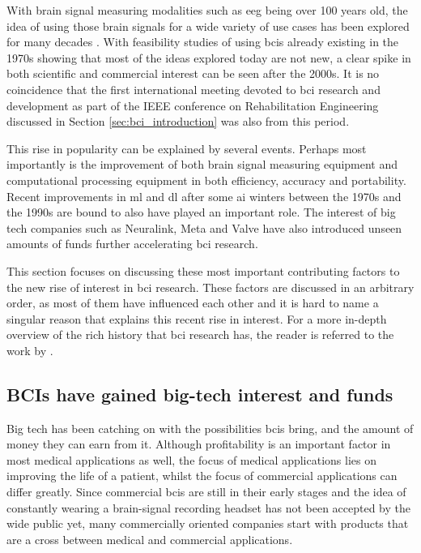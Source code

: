 With brain signal measuring modalities such as \gls{eeg} being over 100 years old, the idea of using those brain signals for a wide variety of use cases has been explored for many decades \citep{human_eeg_discovery, first_eeg, bci_history}.
With feasibility studies of using \glspl{bci} already existing in the 1970s \citep[for example by][]{early_bci} showing that most of the ideas explored today are not new, a clear spike in both scientific and commercial interest can be seen after the 2000s.
It is no coincidence that the first international meeting devoted to \gls{bci} research and development as part of the IEEE conference on Rehabilitation Engineering discussed in Section \ref{sec:bci_introduction} was also from this period.

This rise in popularity can be explained by several events.
Perhaps most importantly is the improvement of both brain signal measuring equipment and computational processing equipment in both efficiency, accuracy and portability.
Recent improvements in \gls{ml} and \gls{dl} after some \gls{ai} winters between the 1970s and the 1990s are bound to also have played an important role.
The interest of big tech companies such as Neuralink, Meta and Valve have also introduced unseen amounts of funds further accelerating \gls{bci} research.

This section focuses on discussing these most important contributing factors to the new rise of interest in \gls{bci} research.
These factors are discussed in an arbitrary order, as most of them have influenced each other and it is hard to name a singular reason that explains this recent rise in interest.
For a more in-depth overview of the rich history that \gls{bci} research has, the reader is referred to the work by \citet{bci_history}.


\subsection{BCIs have gained big-tech interest and funds}
\label{subsec:bci_gaining_popularity_big_tech}

Big tech has been catching on with the possibilities \glspl{bci} bring, and the amount of money they can earn from it.
Although profitability is an important factor in most medical applications as well, the focus of medical applications lies on improving the life of a patient, whilst the focus of commercial applications can differ greatly.
Since commercial \glspl{bci} are still in their early stages and the idea of constantly wearing a brain-signal recording headset has not been accepted by the wide public yet, many commercially oriented companies start with products that are a cross between medical and commercial applications.

